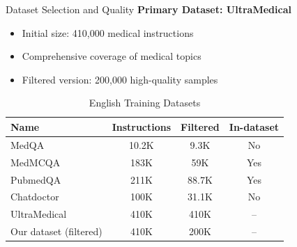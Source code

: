 \begin{frame}{Dataset Selection and Quality}
    \textbf{Primary Dataset: UltraMedical}
    \begin{itemize}
        \item Initial size: 410,000 medical instructions
        \item Comprehensive coverage of medical topics
        \item Filtered version: 200,000 high-quality samples
    \end{itemize}
    
    \vspace{0.5em}
    
    \begin{table}[h]
        \centering
        \footnotesize
        \caption{English Training Datasets}
        \begin{tabular}{lccc}
            \toprule
            \textbf{Name} & \textbf{Instructions} & \textbf{Filtered} & \textbf{In-dataset} \\
            \midrule
            MedQA & 10.2K & 9.3K & No \\
            MedMCQA & 183K & 59K & Yes \\
            PubmedQA & 211K & 88.7K & Yes \\
            Chatdoctor & 100K & 31.1K & No \\
            \rowcolor{highlight!20} UltraMedical & 410K & 410K & – \\
            \rowcolor{improvement!20} Our dataset (filtered) & 410K & 200K & – \\
            \bottomrule
        \end{tabular}
    \end{table}
\end{frame}

